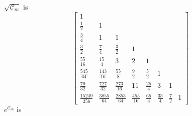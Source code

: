 $\sqrt{\mathcal{C}_{m}}$ is
\begin{displaymath}
\left[\begin{matrix}1 &   &   &   &   &   &   &  \\\frac{1}{2} & 1 &   &   &   &   &   &  \\\frac{3}{4} & 1 & 1 &   &   &   &   &  \\\frac{3}{2} & \frac{7}{4} & \frac{3}{2} & 1 &   &   &   &  \\\frac{55}{16} & \frac{15}{4} & 3 & 2 & 1 &   &   &  \\\frac{545}{64} & \frac{143}{16} & \frac{55}{8} & \frac{9}{2} & \frac{5}{2} & 1 &   &  \\\frac{7 9}{32} & \frac{727}{32} & \frac{273}{16} & 11 & \frac{25}{4} & 3 & 1 &  \\\frac{15249}{256} & \frac{3855}{64} & \frac{2853}{64} & \frac{455}{16} & \frac{65}{4} & \frac{33}{4} & \frac{7}{2} & 1\end{matrix}\right]
\end{displaymath}
$e^{\mathcal{C}_{m}}$ is
